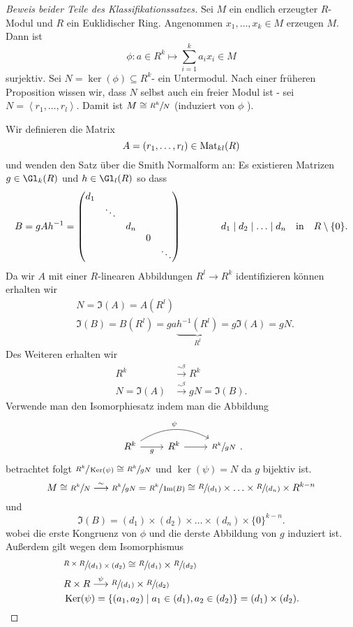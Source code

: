 \begin{proof}[Beweis beider Teile des Klassifikationssatzes]
	Sei $M$ ein endlich erzeugter $R$-Modul und $R$ ein Euklidischer Ring.
	Angenommen $x_1,\ldots,x_{k} \in M$ erzeugen $M$. Dann ist
	\[
	\phi: a \in R^{k} \mapsto \sum_{i=1}^{k} a_{i} x_{i} \in M
	\] 
	surjektiv. Sei $N = \ker(\phi) \subseteq R^{k}$- ein Untermodul. Nach einer früheren Proposition wissen wir, dass $N$ selbst
	auch ein freier Modul ist -  sei $N = \left< r_1,\ldots,r_{l} \right>$. Damit ist $M \cong \sfrac{R^{k}}{N}$ (induziert von $\phi$ ).

	Wir definieren die Matrix
	\[
		A = (r_1,\ldots,r_{l}) \in \operatorname{Mat}_{kl}(R)
	\] 
	und wenden den Satz über die Smith Normalform an: Es existieren Matrizen $g \in \Gl_{k}(R)$ und $h \in \Gl_{l}(R)$ so dass
	\[
	B = g A h^{-1} = \begin{pmatrix} 
		d_1 \\
		& \ddots \\
		& & d_{n} \\
		& & & 0 \\
		& & & & \ddots
	\end{pmatrix} \qquad \qquad d_1 \mid d_2 \mid \ldots \mid d_{n} \qq{in} R \setminus \{0\}  
	.\] 
	Da wir $A$ mit einer $R$-linearen Abbildungen $R^{l} \to R^{k}$ identifizieren können erhalten wir
	\begin{align*}
		&N = \Im(A) = A(R^{l})\\
		&\Im(B) = B(R^{l}) = g a \underbrace{h ^{-1}(R^{l})}_{R^{l}} = g \Im(A) = g N
	.\end{align*}
	Des Weiteren erhalten wir
	\begin{align*}
		R^{k} &\overset{\sim^{g}}{\longrightarrow} R^{k}\\
		N = \Im(A) &\overset{\sim^{g}}{\longrightarrow} g N = \Im(B)
	.\end{align*}
	Verwende man den Isomorphiesatz indem man die Abbildung
	\[
		\begin{tikzcd}
			R^k \arrow[r, "g"'] \arrow[rr, "\psi", bend left] & R^k \arrow[r] & \sfrac{R^k}{gN}
		\end{tikzcd}
	.\] 
	betrachtet folgt $\sfrac{R^{k}}{\operatorname{Ker}(\psi)} \cong \sfrac{R^{k}}{gN}$ und $\ker(\psi) = N$ da $g$ bijektiv ist.
	\[
		M \cong \sfrac{R^{k}}{N} \overset{\sim}{\longrightarrow} \sfrac{R^{k}}{gN} = \sfrac{R^{k}}{\Im(B)} \cong \sfrac{R}{(d_1)} \times  \ldots \times \sfrac{R}{(d_{n})} \times  R^{k-n}
	\] 
	und
	\[
		\Im(B) = (d_1) \times (d_2) \times \ldots \times (d_{n}) \times  \{0\}^{k-n}
	.\]
	wobei die erste Kongruenz von $\phi$ und die derste Abbildung von  $g$ induziert ist.
	Außerdem gilt wegen dem Isomorphismus
	\begin{align*}
		&\sfrac{R \times R}{(d_1) \times (d_2)} \cong \sfrac{R}{(d_1)} \times \sfrac{R}{(d_2)}\\
		&R \times R \overset{\psi}{\longrightarrow} \sfrac{R}{(d_1)} \times \sfrac{R}{(d_2)}\\
		&\operatorname{Ker}(\psi) = \{(a_1,a_2) \mid a_1 \in (d_1), a_2 \in (d_2)\} = (d_1) \times (d_2)
	.\end{align*} 
\end{proof}

